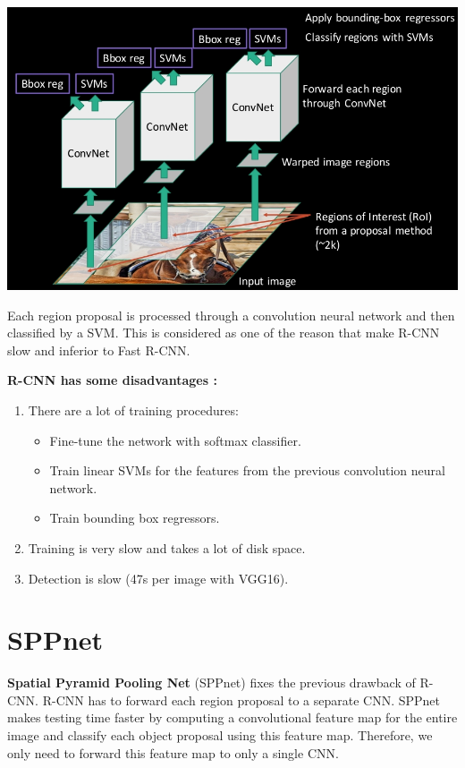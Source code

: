 \documentclass{article}
\begin{document}
\begin{center}
	\includegraphics[scale=0.4]{rcnn_detail}
\end{center}

Each region proposal is processed through a convolution neural network and then classified by a SVM. This is considered as one of the reason that make R-CNN slow and inferior to Fast R-CNN.

\noindent \textbf{R-CNN has some disadvantages \cite{arxiv/fast-rcnn,slides/fast-rcnn}:}
\begin{enumerate}
	\item There are a lot of training procedures:
	\begin{itemize}
		\item Fine-tune the network with softmax classifier.
		\item Train linear SVMs for the features from the previous convolution neural network.
		\item Train bounding box regressors.
	\end{itemize}
	\item Training is very slow and takes a lot of disk space.
	\item Detection is slow (47s per image with VGG16).
\end{enumerate}

\section{SPPnet}

\textbf{Spatial Pyramid Pooling Net} (SPPnet) fixes the previous drawback of R-CNN. R-CNN has to forward each region proposal to a separate CNN. SPPnet makes testing time faster by computing a convolutional feature map for the entire image and classify each object proposal using this feature map. Therefore, we only need to forward this feature map to only a single CNN.
\end{document}
